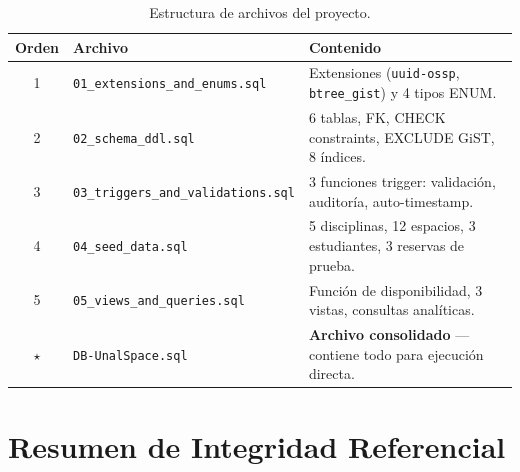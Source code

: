 \documentclass[12pt, a4paper]{article}
\begin{document}
\begin{table}[H]
\centering
\renewcommand{\arraystretch}{1.3}
\begin{tabularx}{\textwidth}{c l X}
    \toprule
    \textbf{Orden} & \textbf{Archivo} & \textbf{Contenido} \\
    \midrule
    1 & \texttt{01\_extensions\_and\_enums.sql} & Extensiones (\texttt{uuid-ossp}, \texttt{btree\_gist}) y 4 tipos ENUM. \\
    2 & \texttt{02\_schema\_ddl.sql} & 6 tablas, FK, CHECK constraints, EXCLUDE GiST, 8 índices. \\
    3 & \texttt{03\_triggers\_and\_validations.sql} & 3 funciones trigger: validación, auditoría, auto-timestamp. \\
    4 & \texttt{04\_seed\_data.sql} & 5 disciplinas, 12 espacios, 3 estudiantes, 3 reservas de prueba. \\
    5 & \texttt{05\_views\_and\_queries.sql} & Función de disponibilidad, 3 vistas, consultas analíticas. \\
    \midrule
    $\star$ & \texttt{DB-UnalSpace.sql} & \textbf{Archivo consolidado} --- contiene todo para ejecución directa. \\
    \bottomrule
\end{tabularx}
\caption{Estructura de archivos del proyecto.}
\end{table}


\section{Resumen de Integridad Referencial}
\end{document}
